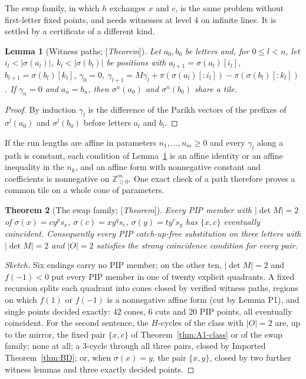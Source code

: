 \documentclass[11pt]{amsart}
\theoremstyle{plain}
\newtheorem{theorem}{Theorem}[section]
\newtheorem{lemma}[theorem]{Lemma}
\theoremstyle{definition}
\theoremstyle{remark}
\newcommand{\Z}{\mathbb{Z}}
\newcommand{\Status}[1]{\textup{[\textit{#1}]}}
\begin{document}
The swap family, in which $h$ exchanges $x$ and $c$, is the same problem without first-letter fixed points, and needs witnesses at level $4$ on infinite lines. It is settled by a certificate of a different kind.

\begin{lemma}[Witness paths; \Status{Theorem}]\label{lem:witness-path}
Let $a_0,b_0$ be letters and, for $0\le l<n$, let $i_l<|\sigma(a_l)|$, $k_l<|\sigma(b_l)|$ be positions with $a_{l+1}=\sigma(a_l)[i_l]$, $b_{l+1}=\sigma(b_l)[k_l]$, $\gamma_0=0$, $\gamma_{l+1}=M\gamma_l+\pi(\sigma(a_l)[{:}i_l])-\pi(\sigma(b_l)[{:}k_l])$. If $\gamma_n=0$ and $a_n=b_n$, then $\sigma^n(a_0)$ and $\sigma^n(b_0)$ share a tile.
\end{lemma}
\begin{proof}
By induction $\gamma_l$ is the difference of the Parikh vectors of the prefixes of $\sigma^l(a_0)$ and $\sigma^l(b_0)$ before letters $a_l$ and $b_l$.
\end{proof}

If the run lengths are affine in parameters $n_1,\dots,n_m\ge0$ and every $\gamma_l$ along a path is constant, each condition of Lemma~\ref{lem:witness-path} is an affine identity or an affine inequality in the $n_k$, and an affine form with nonnegative constant and coefficients is nonnegative on $\Z_{\ge0}^m$. One exact check of a path therefore proves a common tile on a whole cone of parameters.

\begin{theorem}[The swap family; \Status{Theorem}]\label{thm:swap-family}
Every PIP member with $|\det M|=2$ of $\sigma(x)=cy^ps_x$, $\sigma(c)=xy^qs_c$, $\sigma(y)=ty^rs_y$ has $\{x,c\}$ eventually coincident. Consequently every PIP catch-up-free substitution on three letters with $|\det M|=2$ and $|O|=2$ satisfies the strong coincidence condition for every pair.
\end{theorem}
\begin{proof}[Sketch]
Six endings carry no PIP member; on the other ten, $|\det M|=2$ and $f(-1)<0$ put every PIP member in one of twenty explicit quadrants. A fixed recursion splits each quadrant into cones closed by verified witness paths, regions on which $f(1)$ or $f(-1)$ is a nonnegative affine form (cut by Lemma P1), and single points decided exactly: $42$ cones, $6$ cuts and $20$ PIP points, all eventually coincident. For the second sentence, the $H$-cycles of the class with $|O|=2$ are, up to the mirror, the fixed pair $\{x,c\}$ of Theorem~\ref{thm:A1-class} or of the swap family; none at all; a $3$-cycle through all three pairs, closed by Imported Theorem~\ref{thm:BD}; or, when $\sigma(x)=y$, the pair $\{x,y\}$, closed by two further witness lemmas and three exactly decided points.
\end{proof}
\end{document}
